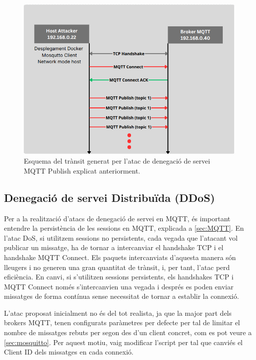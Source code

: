   \begin{figure}[H]
    \centering
    \includegraphics[width=1\textwidth]{img/DoSsimple.png}
    \caption{Esquema del trànsit generat per l'atac de denegació de servei MQTT Publish explicat anteriorment.}
    \label{fig:DoSsimple}
  \end{figure}


  \subsection{Denegació de servei Distribuïda (DDoS)}

Per a la realització d'atacs de denegació de servei en MQTT, és important entendre la persistència de les sessions en MQTT, explicada a \ref{sec:MQTT}. En l'atac DoS, si utilitzem sessions no persistents, cada vegada que l'atacant vol publicar un missatge, ha de tornar a intercanviar el handshake TCP i el handshake MQTT Connect. Els paquets intercanviats d'aquesta manera són lleugers i no generen una gran quantitat de trànsit, i, per tant, l'atac perd eficiència. En canvi, si s'utilitzen sessions persistents, els handshakes TCP i MQTT Connect només s'intercanvien una vegada i després es poden enviar missatges de forma contínua sense necessitat de tornar a establir la connexió.

L'atac proposat inicialment no és del tot realista, ja que la major part dels brokers MQTT, tenen configurats paràmetres per defecte per tal de limitar el nombre de missatges rebuts per segon des d'un client concret, com es pot veure a \ref{sec:mosquitto}. Per aquest motiu, vaig modificar l'script per tal que canviés el Client ID dels missatges en cada connexió.

